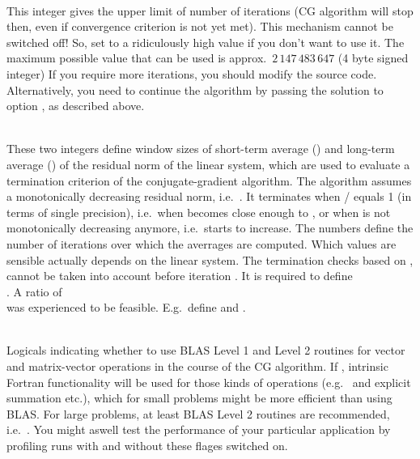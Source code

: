 \textbf{}\\
This integer gives the upper limit of number of iterations (CG algorithm will stop then, even if convergence 
criterion is not yet met).
This mechanism cannot be switched off! So, set to a ridiculously high value if you don't want to use it. 
The maximum possible value that can be used is approx.\ $2\,147\,483\,647$ (4 byte signed integer)
If you require more iterations, you should modify the source code. Alternatively, you need to continue the 
algorithm by passing the solution to option , as described above.

\textbf{}\\
These two integers define window sizes of short-term average () and long-term average () 
of the residual norm of the linear system, which are used to evaluate a termination criterion of the 
conjugate-gradient algorithm. The algorithm assumes a monotonically decreasing residual norm, 
i.e.\ .
It terminates when / equals 1 (in terms of single precision), i.e.\ when  
becomes close enough to , or when  is not monotonically decreasing anymore, i.e.\ starts 
to increase.
The numbers  define the number of iterations over which the averrages are 
computed. Which values are sensible actually depends on the linear system. 
The termination checks based on ,  cannot be taken into account before iteration 
. It is required to define\\
.
A ratio of \\
 was experienced to be feasible. E.g.\ define 
and .

\textbf{}\\
Logicals indicating whether to use BLAS Level 1 and Level 2 routines for vector and
matrix-vector operations in the course of the CG algorithm. If , intrinsic Fortran
functionality will be used for those kinds of operations (e.g.\  and explicit summation etc.),
which for small problems might be more efficient than using BLAS. For large problems, at least
BLAS Level 2 routines are recommended, i.e.\ . You might aswell test the 
performance of your particular application by profiling runs with and without these flages switched on.

